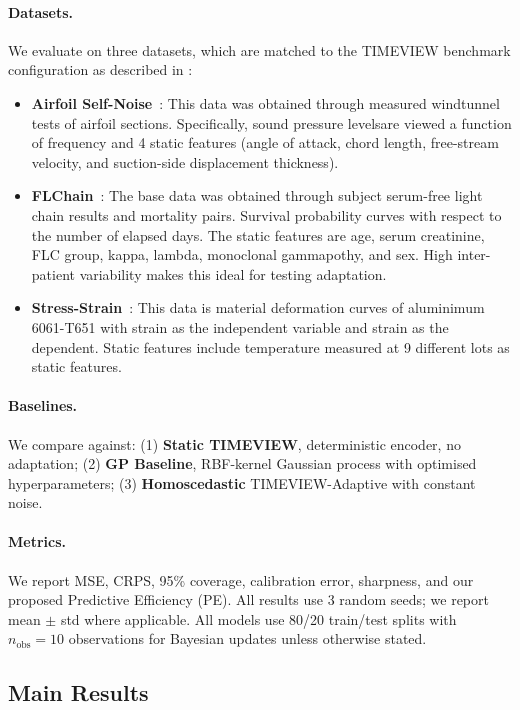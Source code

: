 \documentclass[final]{article}
\begin{document}
\paragraph{Datasets.} We evaluate on three datasets, which are matched to the TIMEVIEW benchmark configuration as described in \cite{kacprzyk2024towards}:
\begin{itemize}
    \item \textbf{Airfoil Self-Noise}~\citep{brooks1989airfoil}: This data was obtained through measured windtunnel tests of airfoil sections. Specifically, sound pressure levelsare viewed a function of frequency and 4 static features (angle of attack, chord length, free-stream velocity, and suction-side displacement thickness).
    \item \textbf{FLChain}~\citep{dispenzieri2012use}: The base data was obtained through subject serum-free light chain results and mortality pairs. Survival probability curves with respect to the number of elapsed days. The static features are age, serum creatinine, FLC group, kappa, lambda, monoclonal gammapothy, and sex. High inter-patient variability makes this ideal for testing adaptation.
    \item \textbf{Stress-Strain}~\citep{aakash2019stress}: This data is material deformation curves of aluminimum 6061-T651 with strain as the independent variable and strain as the dependent. Static features include temperature measured at 9 different lots as static features.
\end{itemize}

\paragraph{Baselines.} We compare against: (1) \textbf{Static TIMEVIEW}, deterministic encoder, no adaptation; (2) \textbf{GP Baseline}, RBF-kernel Gaussian process with optimised hyperparameters; (3) \textbf{Homoscedastic} TIMEVIEW-Adaptive with constant noise.

\paragraph{Metrics.} We report MSE, CRPS, 95\% coverage, calibration error, sharpness, and our proposed Predictive Efficiency (PE). All results use 3 random seeds; we report mean $\pm$ std where applicable. All models use 80/20 train/test splits with $n_{\mathrm{obs}} = 10$ observations for Bayesian updates unless otherwise stated.

\subsection{Main Results}
\end{document}
